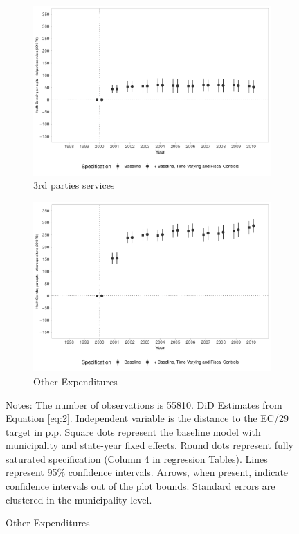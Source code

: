 \begin{figure}[h!]
\begin{center}
    \begin{subfigure}{0.48\textwidth}
        \centering
        \caption{\scriptsize 3rd parties services}\label{fig:7c}
        \includegraphics[width=\textwidth]{plots/siops_despservicoster_pcapita_dist_ec29_baseline_dist_ec29_baseline_7.pdf}
    \end{subfigure}
    \begin{subfigure}{0.48\textwidth}
        \centering
        \caption{\scriptsize Other Expenditures}\label{fig:7d}
        \includegraphics[width=\textwidth]{plots/siops_despoutros_pcapita_dist_ec29_baseline_dist_ec29_baseline_7.pdf}
    \end{subfigure}
    
    \end{center}
    
        \scriptsize{Notes: The number of observations is 55810. DiD Estimates from Equation \ref{eq:2}. Independent variable is the distance to the EC/29 target in p.p. Square dots represent the baseline model with municipality and state-year fixed effects. Round dots represent fully saturated specification (Column 4 in regression Tables). Lines represent 95\% confidence intervals. Arrows, when present, indicate confidence intervals out of the plot bounds. Standard errors are clustered in the municipality level.}
    
\end{figure}